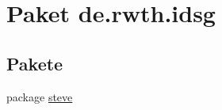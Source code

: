 \hypertarget{namespacede_1_1rwth_1_1idsg}{\section{Paket de.\+rwth.\+idsg}
\label{namespacede_1_1rwth_1_1idsg}
}
\subsection*{Pakete}
\begin{DoxyCompactItemize}
\item 
package \hyperlink{namespacede_1_1rwth_1_1idsg_1_1steve}{steve}
\end{DoxyCompactItemize}
